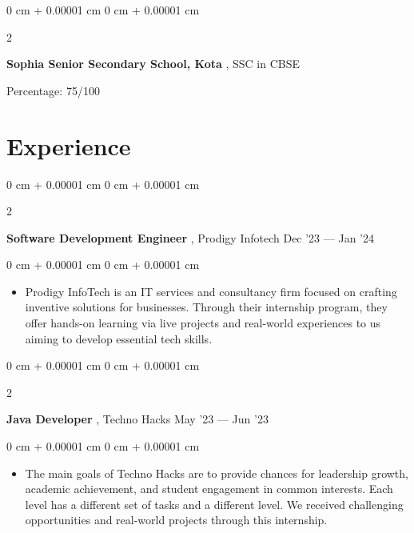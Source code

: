 \documentclass[10pt, letterpaper]{article}
\newenvironment{highlights}{
    \begin{itemize}[
        topsep=0.10 cm,
        parsep=0.10 cm,
        partopsep=0pt,
        itemsep=0pt,
        leftmargin=0 cm + 10pt
    ]
}{
    \end{itemize}
} %
\newenvironment{onecolentry}{
    \begin{adjustwidth}{
        0 cm + 0.00001 cm
    }{
        0 cm + 0.00001 cm
    }
}{
    \end{adjustwidth}
} %
\newenvironment{twocolentry}[2][]{
    \onecolentry
    \def\secondColumn{#2}
    \setcolumnwidth{\fill, 4.5 cm}
    \begin{paracol}{2}
}{
    \switchcolumn \raggedleft \secondColumn
    \end{paracol}
    \endonecolentry
} %
\begin{document}
        \begin{twocolentry}{
            2018
        }

         \textbf{Sophia Senior Secondary School, Kota    }, SSC in CBSE 
            
            Percentage: 75/100
            \end{twocolentry}

    
    \section{Experience}



        
        \begin{twocolentry}{
            Dec '23 — Jan '24 
        }
            \textbf{Software Development Engineer }, Prodigy Infotech \end{twocolentry}

        \vspace{0.10 cm}
        \begin{onecolentry}
            \begin{highlights}
                \item Prodigy InfoTech is an IT services and consultancy firm focused on crafting inventive solutions for businesses. Through their internship program, they offer hands-on learning via live projects and real-world experiences to us aiming to develop essential tech skills.  
            \end{highlights}
        \end{onecolentry}


        \vspace{0.2 cm}

        \begin{twocolentry}{
            May '23 — Jun '23 
        }
            \textbf{Java Developer }, Techno Hacks  \end{twocolentry}

        \vspace{0.10 cm}
        \begin{onecolentry}
            \begin{highlights}
                \item The main goals of Techno Hacks are to provide chances for leadership growth, academic achievement, and student engagement in common interests. Each level has a different set of tasks and a different level. We received challenging opportunities and real-world projects through this internship.  
            \end{highlights}
        \end{onecolentry}
\end{document}
